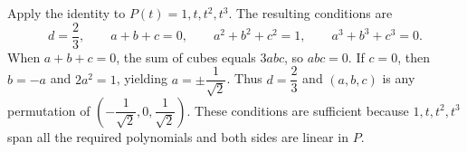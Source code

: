 Apply the identity to $P(t)=1,t,t^2,t^3$. The resulting conditions are
\[d=\dfrac{2}{3},\qquad a+b+c=0,\qquad a^2+b^2+c^2=1,\qquad a^3+b^3+c^3=0.\]
When $a+b+c=0$, the sum of cubes equals $3abc$, so $abc=0$. If $c=0$, then $b=-a$ and $2a^2=1$, yielding $a=\pm\dfrac{1}{\sqrt2}$. Thus $d=\dfrac{2}{3}$ and $(a,b,c)$ is any permutation of $\left(-\dfrac{1}{\sqrt2},0,\dfrac{1}{\sqrt2}\right)$. These conditions are sufficient because $1,t,t^2,t^3$ span all the required polynomials and both sides are linear in $P$.

